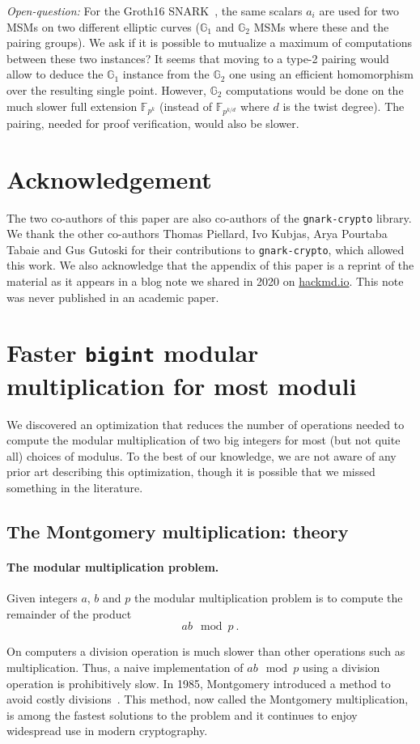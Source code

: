 \documentclass[journal=tches,spthm]{iacrtrans}
\newcommand{\F}{\ensuremath{\mathbb F}}
\newcommand{\G}{\ensuremath{\mathbb G}}
\begin{document}
\textit{Open-question:} For the Groth16 SNARK~\cite{EC:Groth16}, the same
scalars $a_i$ are used for two MSMs on two different elliptic curves ($\G_1$
and $\G_2$ MSMs where these and the pairing groups).  We ask if it is possible
to mutualize a maximum of computations between these two instances? It seems
that moving to a type-2 pairing would allow to deduce the $\G_1$ instance from
the $\G_2$ one using an efficient homomorphism over the resulting single point.
However, $\G_2$ computations would be done on the much slower full extension
$\F_{p^k}$ (instead of $\F_{p^{k/d}}$ where $d$ is the twist degree).  The
pairing, needed for proof verification, would also be slower.

\section*{Acknowledgement}
The two co-authors of this paper are also co-authors of the
\texttt{gnark-crypto} library. We thank the other co-authors Thomas Piellard,
Ivo Kubjas, Arya Pourtaba Tabaie and Gus Gutoski for their contributions to
\texttt{gnark-crypto}, which allowed this work. We also acknowledge that the
appendix of this paper is a reprint of the material as it appears in a blog
note we shared in 2020 on \url{hackmd.io}. This note was never published in an
academic paper.
\appendix
\section{Faster \texttt{bigint} modular multiplication for most moduli}
\label{appendix}
We discovered an optimization that reduces the number of operations needed to
compute the modular multiplication of two big integers for most (but not quite
all) choices of modulus. To the best of our knowledge, we are not aware of any
prior art describing this optimization, though it is possible that we missed
something in the literature.
%
\subsection{The Montgomery multiplication: theory}
\paragraph{The modular multiplication problem.}
Given integers $a$, $b$ and $p$ the modular multiplication problem is to
compute the remainder of the product
$$ ab \mod p~.$$

On computers a division operation is much slower than other operations such as
multiplication. Thus, a naive implementation of $ab \mod p$ using a
division operation is prohibitively slow.  In 1985, Montgomery introduced a
method to avoid costly divisions~\cite{Montgomery85}. This method, now called the Montgomery
multiplication, is among the fastest solutions to the problem and it continues
to enjoy widespread use in modern cryptography.
\end{document}
